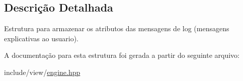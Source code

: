 \subsection{Descrição Detalhada}
Estrutura para armazenar os atributos das mensagens de log (mensagens explicativas ao usuario). 

A documentação para esta estrutura foi gerada a partir do seguinte arquivo:\begin{DoxyCompactItemize}
\item 
include/view/\hyperlink{engine_8hpp}{engine.hpp}\end{DoxyCompactItemize}

